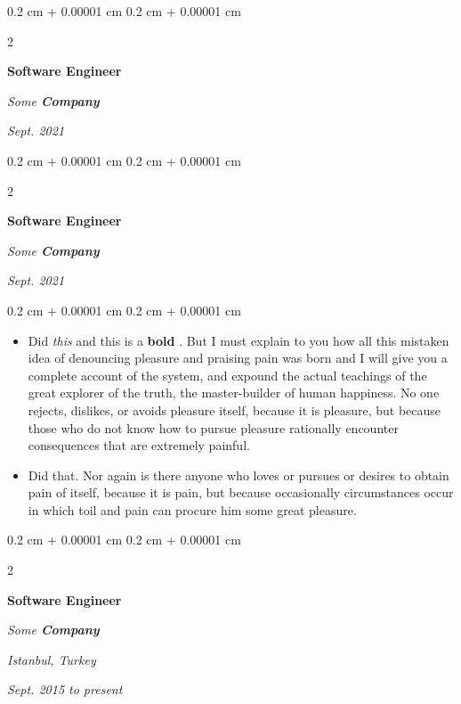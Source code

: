 \documentclass[10pt, letterpaper]{article}
\newenvironment{highlights}{
    \begin{itemize}[
        topsep=0.10 cm,
        parsep=0.10 cm,
        partopsep=0pt,
        itemsep=0pt,
        leftmargin=0.4 cm + 10pt
    ]
}{
    \end{itemize}
} %
\newenvironment{onecolentry}{
    \begin{adjustwidth}{
        0.2 cm + 0.00001 cm
    }{
        0.2 cm + 0.00001 cm
    }
}{
    \end{adjustwidth}
} %
\newenvironment{twocolentry}[2][]{
    \onecolentry
    \def\secondColumn{#2}
    \setcolumnwidth{\fill, 4.5 cm}
    \begin{paracol}{2}
}{
    \switchcolumn \raggedleft \secondColumn
    \end{paracol}
    \endonecolentry
} %
\let\hrefWithoutArrow\href
\renewcommand{\href}[2]{\hrefWithoutArrow{#1}{\mbox{\ifthenelse{\equal{#2}{}}{ }{#2 }\raisebox{.15ex}{\footnotesize \faExternalLink*}}}}
\begin{document}
        \vspace{0.2 cm-3px}

        \begin{twocolentry}{
            
            
        \textit{Sept. 2021}}
            \textbf{Software Engineer}
            
            \textit{Some \textbf{Company}}
        \end{twocolentry}



        \vspace{0.2 cm-3px}

        \begin{twocolentry}{
            
            
        \textit{Sept. 2021}}
            \textbf{Software Engineer}
            
            \textit{Some \textbf{Company}}
        \end{twocolentry}

        \vspace{0.10 cm-3px}
        \begin{onecolentry}
            \begin{highlights}
                \item Did \textit{this} and this is a \textbf{bold} \href{https://example.com}{link}. But I must explain to you how all this mistaken idea of denouncing pleasure and praising pain was born and I will give you a complete account of the system, and expound the actual teachings of the great explorer of the truth, the master-builder of human happiness. No one rejects, dislikes, or avoids pleasure itself, because it is pleasure, but because those who do not know how to pursue pleasure rationally encounter consequences that are extremely painful.
                \item Did that. Nor again is there anyone who loves or pursues or desires to obtain pain of itself, because it is pain, but because occasionally circumstances occur in which toil and pain can procure him some great pleasure.
            \end{highlights}
        \end{onecolentry}


        \vspace{0.2 cm-3px}

        \begin{twocolentry}{
        \textit{Istanbul, Turkey}    
            
        \textit{Sept. 2015 to present}}
            \textbf{Software Engineer}
            
            \textit{Some \textbf{Company}}
        \end{twocolentry}
\end{document}
